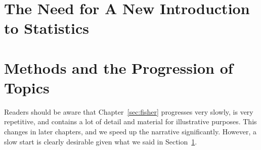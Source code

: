 \addchap{\lsPrefaceTitle}

\section{The Need for A New Introduction to Statistics}\label{sec:need}

\section{Methods and the Progression of Topics}

Readers should be aware that Chapter~\ref{sec:fisher} progresses very slowly, is very repetitive, and contains a lot of detail and material for illustrative purposes.
This changes in later chapters, and we speed up the narrative significantly.
However, a slow start is clearly desirable given what we said in Section~\ref{sec:need}.
